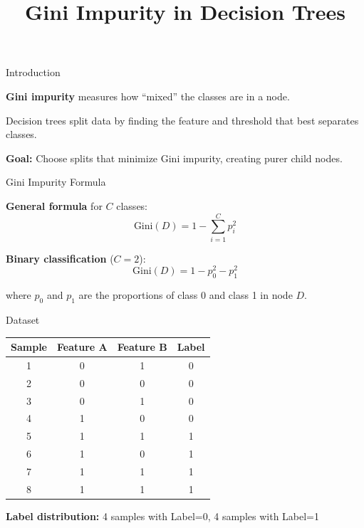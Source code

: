 \documentclass{beamer}
\title{Gini Impurity in Decision Trees}
\author{}
\date{}
\begin{document}
\begin{frame}
\titlepage
\end{frame}

\begin{frame}{Introduction}

\textbf{Gini impurity} measures how ``mixed'' the classes are in a node.

\vspace{1em}

Decision trees split data by finding the feature and threshold that best separates classes.

\vspace{1em}

\textbf{Goal:} Choose splits that minimize Gini impurity, creating purer child nodes.

\end{frame}

\begin{frame}{Gini Impurity Formula}

\textbf{General formula} for $C$ classes:
\[
\text{Gini}(D) = 1 - \sum_{i=1}^{C} p_i^2
\]

\vspace{1em}

\textbf{Binary classification} ($C = 2$):
\[
\text{Gini}(D) = 1 - p_0^2 - p_1^2
\]

where $p_0$ and $p_1$ are the proportions of class 0 and class 1 in node $D$.

\end{frame}

\begin{frame}{Dataset}

\centering
\begin{tabular}{cccc}
\toprule
Sample & Feature A & Feature B & Label \\
\midrule
1 & 0 & 1 & 0 \\
2 & 0 & 0 & 0 \\
3 & 0 & 1 & 0 \\
4 & 1 & 0 & 0 \\
5 & 1 & 1 & 1 \\
6 & 1 & 0 & 1 \\
7 & 1 & 1 & 1 \\
8 & 1 & 1 & 1 \\
\bottomrule
\end{tabular}

\vspace{1em}

\textbf{Label distribution:} 4 samples with Label=0, 4 samples with Label=1

\end{frame}
\end{document}
